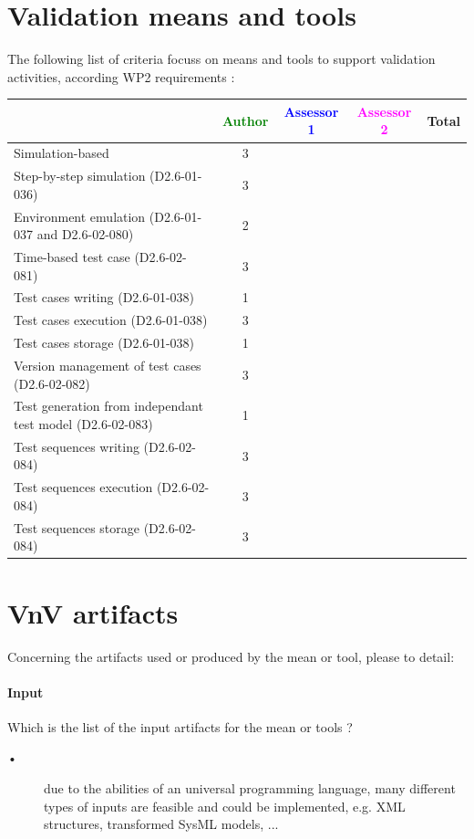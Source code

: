 \section{Validation means and tools}

The following list of criteria focuss on means and tools to support validation activities, according WP2  requirements :

\begin{tabular}{|l | c | c | c | c|}
\hline
& \textcolor{green}{Author} & \textcolor{blue}{Assessor 1} & \textcolor{magenta}{Assessor 2} & Total \\
\hline 
Simulation-based &3 & & &  \\
\hline
Step-by-step simulation (D2.6-01-036) &3 & & &  \\
\hline
Environment emulation (D2.6-01-037 and D2.6-02-080) &2 & & &  \\
\hline
Time-based test case (D2.6-02-081) &3 & & &  \\
\hline
Test cases writing (D2.6-01-038) &1 & & &  \\
\hline
Test cases execution (D2.6-01-038) &3 & & &  \\
\hline
Test cases storage (D2.6-01-038) &1 & & &  \\
\hline
Version management of test cases (D2.6-02-082) &3 & & &  \\
\hline
Test generation from independant test model (D2.6-02-083) &1 & & &  \\
\hline
Test sequences writing (D2.6-02-084) &3 & & &  \\
\hline
Test sequences execution (D2.6-02-084) &3 & & &  \\
\hline
Test sequences storage (D2.6-02-084) &3 & & &  \\
\hline
\end{tabular}

\section{VnV artifacts}


Concerning the artifacts used or produced by the mean or tool, please to detail:

\paragraph{Input}
    Which is the list of the input artifacts for the mean or tools ?
    
\begin{author_comment}
\begin{description}
\item [•] due to the abilities of an universal programming language, many different types of inputs are feasible and could be implemented, e.g. XML structures, transformed SysML models, ...
\end{description}
\end{author_comment}
     
